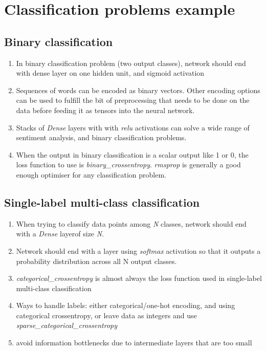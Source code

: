 \documentclass[12pt, a4paper]{article}
\begin{document}
\section{Classification problems example}

\subsection{Binary classification}
\begin{enumerate}
   \item In binary classification problem (two output classes), network should
   end with dense layer on one hidden unit, and sigmoid activation
   \item Sequences of words can be encoded as binary vectors. Other encoding
   options can be used to fulfill the bit of preprocessing that needs to be done
   on the data before feeding it as tensors into the neural network.
   \item Stacks of \textit{Dense} layers with with \textit{relu}
   activations can solve a wide range of sentiment analysis, and binary classification problems.
   \item When the output in binary classification is a scalar output like 1 or 0,
   the loss function to use is \textit{binary\_crossentropy}. 
   \textit{rmsprop} is generally a good enough optimiser for any classification problem.
\end{enumerate}

\subsection{Single-label multi-class classification}
\begin{enumerate}
   \item When trying to classify data points among \textit{N} classes,
   network should end with a \textit{Dense} layerof size \textit{N}.
   \item Network should end with a layer using \textit{softmax} activation
   so that it outputs a probability distribution across all N output classes.
   \item \textit{categorical\_crossentropy} is almost always the loss function used
   in single-label multi-class classification
   \item Ways to handle labels: either categorical/one-hot encoding, and using categorical crossentropy,
   or leave data as integers and use \textit{sparse\_categorical\_crossentropy}
   \item avoid information bottlenecks due to intermediate layers that are too small 
\end{enumerate}
\end{document}
